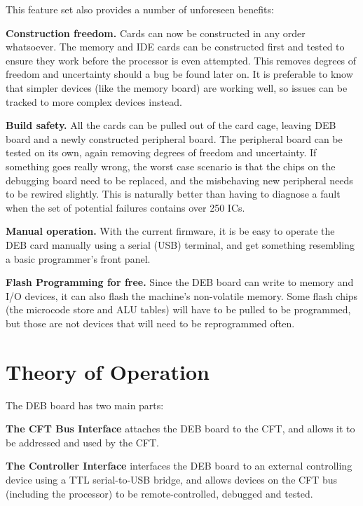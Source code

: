 This feature set also provides a number of unforeseen benefits:

\begin{description}
\item {\bfseries Construction freedom.} Cards can now be constructed in any
  order whatsoever. The memory and IDE cards can be constructed ﬁrst
  and tested to ensure they work before the processor is even
  attempted. This removes degrees of freedom and uncertainty should a
  bug be found later on. It is preferable to know that simpler devices
  (like the memory board) are working well, so issues can be tracked
  to more complex devices instead.
  
\item {\bfseries Build safety.} All the cards can be pulled out of the card
  cage, leaving \gls{DEB} board and a newly constructed peripheral
  board. The peripheral board can be tested on its own, again removing
  degrees of freedom and uncertainty. If something goes really wrong,
  the worst case scenario is that the chips on the debugging board
  need to be replaced, and the misbehaving new peripheral needs to be
  rewired slightly. This is naturally better than having to diagnose a
  fault when the set of potential failures contains over 250 ICs.

\item {\bfseries Manual operation.} With the current firmware, it is be easy
  to operate the \gls{DEB} card manually using a serial (\gls{USB})
  terminal, and get something resembling a basic programmer's front
  panel.

\item {\bfseries Flash Programming for free.} Since the \gls{DEB} board can
  write to memory and I/O devices, it can also flash the machine's
  non-volatile memory. Some flash chips (the microcode store and ALU
  tables) will have to be pulled to be programmed, but those are not
  devices that will need to be reprogrammed often.

\end{description}

\section{Theory of Operation}

The DEB board has two main parts:

\begin{description}
\item {\bfseries The CFT Bus Interface} attaches the DEB board to the CFT,
  and allows it to be addressed and used by the CFT.

\item {\bfseries The Controller Interface} interfaces the DEB board to an
  external controlling device using a TTL serial-to-USB bridge, and
  allows devices on the CFT bus (including the processor) to be
  remote-controlled, debugged and tested.
\end{description}

